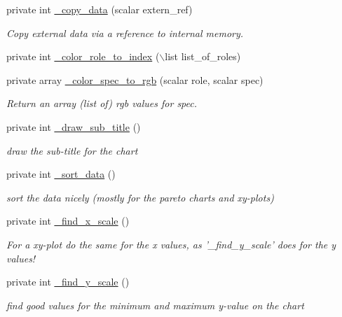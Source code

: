 \begin{DoxyCompactItemize}
private int \hyperlink{classChart_1_1Base_ac704c89b5b4b3f3f0e6fa35d6c5ca6c3}{\_\-copy\_\-data} (scalar extern\_\-ref)
\begin{DoxyCompactList}\small\item\em Copy external data via a reference to internal memory. \item\end{DoxyCompactList}\item 
private int \hyperlink{classChart_1_1Base_a43111a8e1210740ebd3a6aa9f9567c82}{\_\-color\_\-role\_\-to\_\-index} ($\backslash$list list\_\-of\_\-roles)
\item 
private array \hyperlink{classChart_1_1Base_a6a97b446c6c2f646dddd7f2a0076ba2e}{\_\-color\_\-spec\_\-to\_\-rgb} (scalar role, scalar spec)
\begin{DoxyCompactList}\small\item\em Return an array (list of) rgb values for spec. \item\end{DoxyCompactList}\item 
private int \hyperlink{classChart_1_1Base_afd4f3ee3925d1e765e099c80e6c98da7}{\_\-draw\_\-sub\_\-title} ()
\begin{DoxyCompactList}\small\item\em draw the sub-\/title for the chart \item\end{DoxyCompactList}\item 
private int \hyperlink{classChart_1_1Base_ade88df5ecdc74e50ea683b63424ba84a}{\_\-sort\_\-data} ()
\begin{DoxyCompactList}\small\item\em sort the data nicely (mostly for the pareto charts and xy-\/plots) \item\end{DoxyCompactList}\item 
private int \hyperlink{classChart_1_1Base_a694b293ee3d92e706b1743cb1fa9d09d}{\_\-find\_\-x\_\-scale} ()
\begin{DoxyCompactList}\small\item\em For a xy-\/plot do the same for the x values, as '\_\-find\_\-y\_\-scale' does for the y values! \item\end{DoxyCompactList}\item 
private int \hyperlink{classChart_1_1Base_acb2fe91b2d57e43d84b1bc6f092ac68d}{\_\-find\_\-y\_\-scale} ()
\begin{DoxyCompactList}\small\item\em find good values for the minimum and maximum y-\/value on the chart \item\end{DoxyCompactList}\item 

\end{DoxyCompactItemize}

